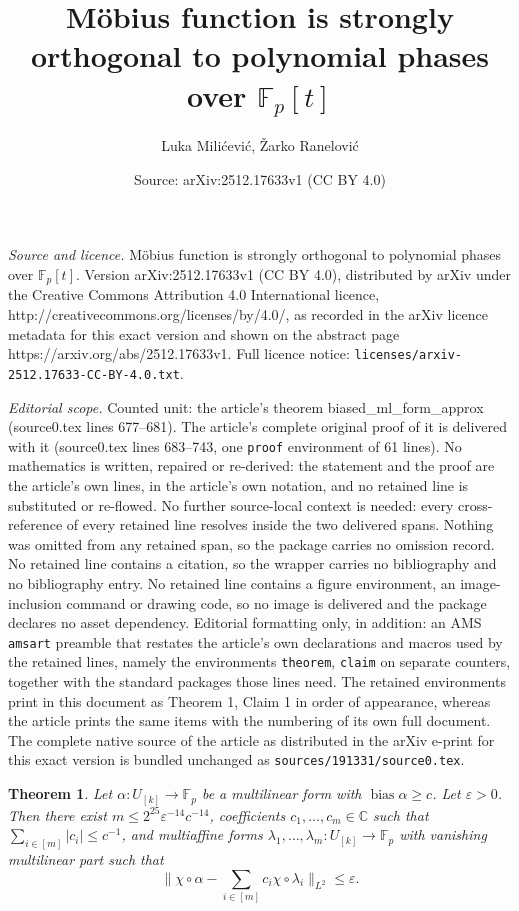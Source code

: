 \documentclass[10pt,a4paper]{amsart}
\title{M\"obius function is strongly orthogonal to polynomial phases over $\mathbb{F}_p[t]$}
\author{Luka Mili\'cevi\'c, \v{Z}arko Ran{\dj}elovi\'c}
\date{Source: arXiv:2512.17633v1 (CC BY 4.0)}
\newtheorem{theorem}{Theorem}
\newcommand{\on}[1]{
	\operatorname{#1}
}
\begin{document}
\maketitle

\noindent\emph{Source and licence.} M\"obius function is strongly orthogonal to polynomial phases over $\mathbb{F}_p[t]$. Version arXiv:2512.17633v1 (CC BY 4.0), distributed by arXiv under the Creative Commons Attribution 4.0 International licence, http://creativecommons.org/licenses/by/4.0/, as recorded in the arXiv licence metadata for this exact version and shown on the abstract page https://arxiv.org/abs/2512.17633v1. Full licence notice: \texttt{licenses/arxiv-2512.17633-CC-BY-4.0.txt}.\par\smallskip

\noindent\textit{Editorial scope.} Counted unit: the article's theorem biased\_ml\_form\_approx (source0.tex lines 677--681). The article's complete original proof of it is delivered with it (source0.tex lines 683--743, one \texttt{proof} environment of 61 lines). No mathematics is written, repaired or re-derived: the statement and the proof are the article's own lines, in the article's own notation, and no retained line is substituted or re-flowed.  No further source-local context is needed: every cross-reference of every retained line resolves inside the two delivered spans.  Nothing was omitted from any retained span, so the package carries no omission record.  No retained line contains a citation, so the wrapper carries no bibliography and no bibliography entry.  No retained line contains a figure environment, an image-inclusion command or drawing code, so no image is delivered and the package declares no asset dependency.  Editorial formatting only, in addition: an AMS \texttt{amsart} preamble that restates the article's own declarations and macros used by the retained lines, namely the environments \texttt{theorem}, \texttt{claim} on separate counters, together with the standard packages those lines need.  The retained environments print in this document as Theorem 1, Claim 1 in order of appearance, whereas the article prints the same items with the numbering of its own full document.  The complete native source of the article as distributed in the arXiv e-print for this exact version is bundled unchanged as \texttt{sources/191331/source0.tex}.
\begin{theorem}\label{biased_ml_form_approx}
    Let $\alpha : U_{[k]} \to \mathbb{F}_p$ be a multilinear form with $\on{bias}\alpha \geq c$. Let $\varepsilon > 0$. Then there exist
    $m \leq 2^{25}\varepsilon^{-14}c^{-14}$, coefficients $c_1, \dots, c_m \in \mathbb{C}$ such that $\sum_{i \in [m]} |c_i| \leq c^{-1}$, and multiaffine forms $\lambda_1, \dots, \lambda_m : U_{[k]} \to \mathbb{F}_p$ with vanishing multilinear part such that 
    \[\Big\| \chi \circ \alpha - \sum_{i \in [m]} c_i \chi \circ \lambda_i\Big\|_{L^2} \leq \varepsilon.\]
\end{theorem}
\end{document}
